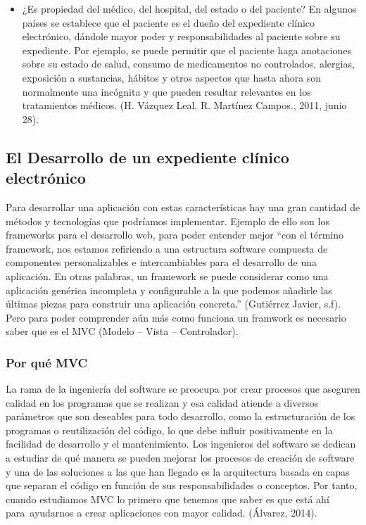 \begin{itemize}
  \item ¿Es propiedad del médico, del hospital, del estado o del paciente? En algunos países se establece que el paciente es el dueño del expediente clínico electrónico, dándole mayor poder y responsabilidades al paciente sobre su expediente. Por ejemplo, se puede permitir que el paciente haga anotaciones sobre su estado de salud, consumo de medicamentos no controlados, alergias, exposición a sustancias, hábitos y otros aspectos que hasta ahora son normalmente una incógnita y que pueden resultar relevantes en los tratamientos médicos. (H. Vázquez Leal, R. Martínez Campos., 2011, junio 28).

\end{itemize}

\subsection{El Desarrollo de un expediente clínico electrónico}

 Para desarrollar una aplicación con estas características hay una gran cantidad de métodos y tecnologías que podríamos implementar. Ejemplo de ello son los frameworks para el desarrollo web, para poder entender mejor “con el término framework, nos estamos refiriendo a una estructura software compuesta de componentes personalizables e intercambiables para el desarrollo de una aplicación. En otras palabras, un framework se puede considerar como una aplicación genérica incompleta y configurable a la que podemos añadirle las últimas piezas para construir una aplicación concreta.” (Gutiérrez Javier, s.f).
Pero para poder comprender aún más como funciona un framwork es necesario saber que es el MVC (Modelo – Vista – Controlador).
\subsubsection{Por qué MVC}

La rama de la ingeniería del software se preocupa por crear procesos que aseguren calidad en los programas que se realizan y esa calidad atiende a diversos parámetros que son deseables para todo desarrollo, como la estructuración de los programas o reutilización del código, lo que debe influir positivamente en la facilidad de desarrollo y el mantenimiento.
Los ingenieros del software se dedican a estudiar de qué manera se pueden mejorar los procesos de creación de software y una de las soluciones a las que han llegado es la arquitectura basada en capas que separan el código en función de sus responsabilidades o conceptos. Por tanto, cuando estudiamos MVC lo primero que tenemos que saber es que está ahí para ayudarnos a crear aplicaciones con mayor calidad. (Álvarez, 2014).

